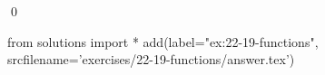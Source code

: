 
\begin{ex}
  \label{ex:22-19-functions}
  
  \qed
\end{ex}
\begin{python0}
from solutions import *
add(label="ex:22-19-functions",
    srcfilename='exercises/22-19-functions/answer.tex')
\end{python0}
